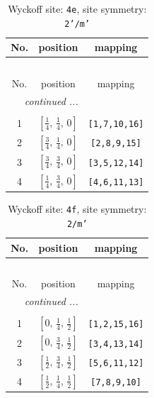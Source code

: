 \documentclass[fleqn,8pt]{jsarticle}
\begin{document}
\renewcommand{\arraystretch}{1.2}
\begin{longtable}{ccc}
\caption{Wyckoff site: {\tt 4e}, site symmetry: {\tt 2'/m'}}
 \\
 \hline \hline
No. & position & mapping \\ \hline \endfirsthead

\multicolumn{2}{l}{\tablename\ \thetable{}} \\
 \hline \hline
No. & position & mapping \\ \hline \endhead

 \hline \hline
\multicolumn{2}{r}{\footnotesize\it continued ...} \\ \endfoot

 \hline \hline
\multicolumn{2}{r}{} \\ \endlastfoot

1 & $\left[ \frac{1}{4},\, \frac{1}{4},\, 0 \right]$ & {\tt [1,7,10,16]} \\ \hline
2 & $\left[ \frac{3}{4},\, \frac{1}{4},\, 0 \right]$ & {\tt [2,8,9,15]} \\ \hline
3 & $\left[ \frac{3}{4},\, \frac{3}{4},\, 0 \right]$ & {\tt [3,5,12,14]} \\ \hline
4 & $\left[ \frac{1}{4},\, \frac{3}{4},\, 0 \right]$ & {\tt [4,6,11,13]} \\
\end{longtable}
\renewcommand{\arraystretch}{1.2}
\begin{longtable}{ccc}
\caption{Wyckoff site: {\tt 4f}, site symmetry: {\tt 2/m'}}
 \\
 \hline \hline
No. & position & mapping \\ \hline \endfirsthead

\multicolumn{2}{l}{\tablename\ \thetable{}} \\
 \hline \hline
No. & position & mapping \\ \hline \endhead

 \hline \hline
\multicolumn{2}{r}{\footnotesize\it continued ...} \\ \endfoot

 \hline \hline
\multicolumn{2}{r}{} \\ \endlastfoot

1 & $\left[ 0,\, \frac{1}{4},\, \frac{1}{2} \right]$ & {\tt [1,2,15,16]} \\ \hline
2 & $\left[ 0,\, \frac{3}{4},\, \frac{1}{2} \right]$ & {\tt [3,4,13,14]} \\ \hline
3 & $\left[ \frac{1}{2},\, \frac{3}{4},\, \frac{1}{2} \right]$ & {\tt [5,6,11,12]} \\ \hline
4 & $\left[ \frac{1}{2},\, \frac{1}{4},\, \frac{1}{2} \right]$ & {\tt [7,8,9,10]} \\
\end{longtable}
\end{document}
